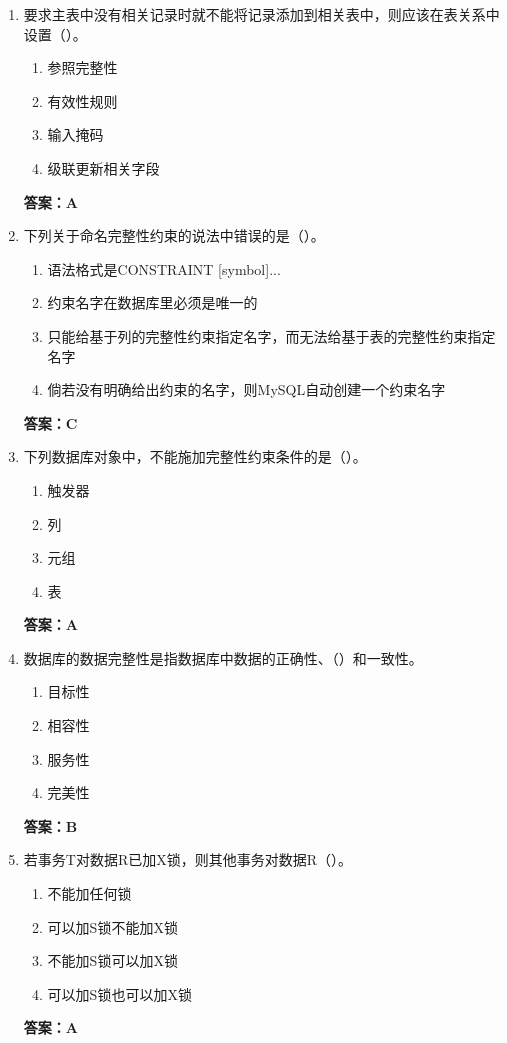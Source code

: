 \documentclass[12pt, a4paper]{article}
\begin{document}
\begin{enumerate}[label=\arabic*.]
	\item 要求主表中没有相关记录时就不能将记录添加到相关表中，则应该在表关系中设置（\quad）。
	      \begin{enumerate}
		      \item 参照完整性
		      \item 有效性规则
		      \item 输入掩码
		      \item 级联更新相关字段
	      \end{enumerate}
	      \textbf{答案：A}

	\item 下列关于命名完整性约束的说法中错误的是（\quad）。
	      \begin{enumerate}
		      \item 语法格式是CONSTRAINT [symbol]...
		      \item 约束名字在数据库里必须是唯一的
		      \item 只能给基于列的完整性约束指定名字，而无法给基于表的完整性约束指定名字
		      \item 倘若没有明确给出约束的名字，则MySQL自动创建一个约束名字
	      \end{enumerate}
	      \textbf{答案：C}

	\item 下列数据库对象中，不能施加完整性约束条件的是（\quad）。
	      \begin{enumerate}
		      \item 触发器
		      \item 列
		      \item 元组
		      \item 表
	      \end{enumerate}
	      \textbf{答案：A}

	\item 数据库的数据完整性是指数据库中数据的正确性、（\quad）和一致性。
	      \begin{enumerate}
		      \item 目标性
		      \item 相容性
		      \item 服务性
		      \item 完美性
	      \end{enumerate}
	      \textbf{答案：B}

	\item 若事务T对数据R已加X锁，则其他事务对数据R（\quad）。
	      \begin{enumerate}
		      \item 不能加任何锁
		      \item 可以加S锁不能加X锁
		      \item 不能加S锁可以加X锁
		      \item 可以加S锁也可以加X锁
	      \end{enumerate}
	      \textbf{答案：A}


\end{enumerate}
\end{document}
